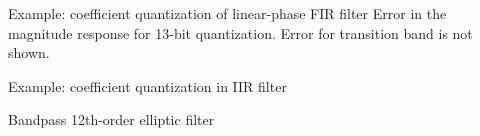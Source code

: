 \documentclass[10pt]{beamer}
\begin{document}
\begin{frame}{Example: coefficient quantization of linear-phase FIR filter}
	Error in the magnitude response for 13-bit quantization. Error for transition band is not shown.
\begin{center}
\end{center}
\end{frame}

%
\begin{frame}{Example: coefficient quantization in IIR filter}

Bandpass 12th-order elliptic filter
\begin{columns}
\begin{column}{0.5\textwidth}
	\begin{center}
		\resizebox{\textwidth}{!}{}
	\end{center}
\end{column}

\begin{column}{0.6\textwidth}
	\begin{center}
		\resizebox{\textwidth}{!}{}
	\end{center}
\end{column}
\end{columns}
\end{frame}
\end{document}
